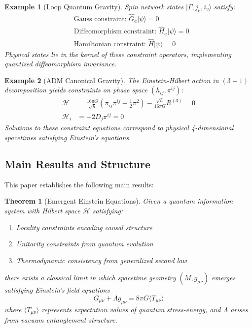 \documentclass[11pt,a4paper]{article}
\newtheorem{theorem}{Theorem}[section]
\newtheorem{example}{Example}[section]
\theoremstyle{remark}
\theoremstyle{definition}
\begin{document}
\begin{example}[Loop Quantum Gravity]
Spin network states $|\Gamma, j_e, i_v\rangle$ satisfy:
\begin{align}
&\text{Gauss constraint: } \hat{G}_a |\psi\rangle = 0 \\
&\text{Diffeomorphism constraint: } \hat{H}_a |\psi\rangle = 0 \\
&\text{Hamiltonian constraint: } \hat{H} |\psi\rangle = 0
\end{align}
Physical states lie in the kernel of these constraint operators, implementing quantized diffeomorphism invariance.
\end{example}

\begin{example}[ADM Canonical Gravity]
The Einstein-Hilbert action in $(3+1)$ decomposition yields constraints on phase space $(h_{ij}, \pi^{ij})$:
\begin{align}
\mathcal{H} &= \frac{16\pi G}{\sqrt{h}}\left(\pi_{ij}\pi^{ij} - \frac{1}{2}\pi^2\right) - \frac{\sqrt{h}}{16\pi G}R^{(3)} = 0 \\
\mathcal{H}_i &= -2 D_j \pi^{ij} = 0
\end{align}
Solutions to these constraint equations correspond to physical 4-dimensional spacetimes satisfying Einstein's equations.
\end{example}

\subsection{Main Results and Structure}

This paper establishes the following main results:

\begin{theorem}[Emergent Einstein Equations]
\label{thm:emergent_einstein}
Given a quantum information system with Hilbert space $\mathcal{H}$ satisfying:
\begin{enumerate}[label=(\roman*)]
\item Locality constraints encoding causal structure
\item Unitarity constraints from quantum evolution
\item Thermodynamic consistency from generalized second law
\end{enumerate}
there exists a classical limit in which spacetime geometry $(M, g_{\mu\nu})$ emerges satisfying Einstein's field equations
\begin{equation}
G_{\mu\nu} + \Lambda g_{\mu\nu} = 8\pi G \langle T_{\mu\nu} \rangle
\end{equation}
where $\langle T_{\mu\nu} \rangle$ represents expectation values of quantum stress-energy, and $\Lambda$ arises from vacuum entanglement structure.
\end{theorem}
\end{document}

